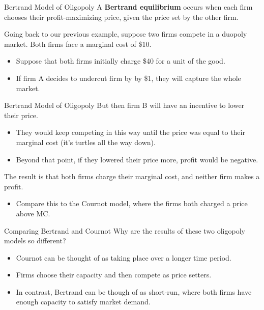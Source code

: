 \documentclass[11pt,t]{beamer}
\begin{document}
\begin{frame}{Bertrand Model of Oligopoly}
  A \textbf{Bertrand equilibrium} occurs when each firm chooses their profit-maximizing price, given the price set by the other firm.

  \bigskip 
  Going back to our previous example, suppose two firms compete in a duopoly market. Both firms face a marginal cost of \$10.

  \begin{itemize}
    \item Suppose that both firms initially charge \$40 for a unit of the good.
    \item If firm A decides to undercut firm by by \$1, they will capture the whole market.
  \end{itemize}

\end{frame}


\begin{frame}{Bertrand Model of Oligopoly}
  But then firm B will have an incentive to lower their price.
  \begin{itemize}
    \item They would keep competing in this way until the price was equal to their marginal cost (it's turtles all the way down).
    \item Beyond that point, if they lowered their price more, profit would be negative.
  \end{itemize}

  \bigskip\pause
  The result is that both firms charge their marginal cost, and neither firm makes a profit.

  \begin{itemize}
    \item Compare this to the Cournot model, where the firms both charged a price above MC.
  \end{itemize}
\end{frame}


\begin{frame}{Comparing Bertrand and Cournot}
  Why are the results of these two oligopoly models so different?

  \begin{itemize}
    \item Cournot can be thought of as taking place over a longer time period.
    \item Firms choose their capacity and then compete as price setters.
    \item In contrast, Bertrand can be though of as short-run, where both firms have enough capacity to satisfy market demand.
  \end{itemize}
\end{frame}
\end{document}

